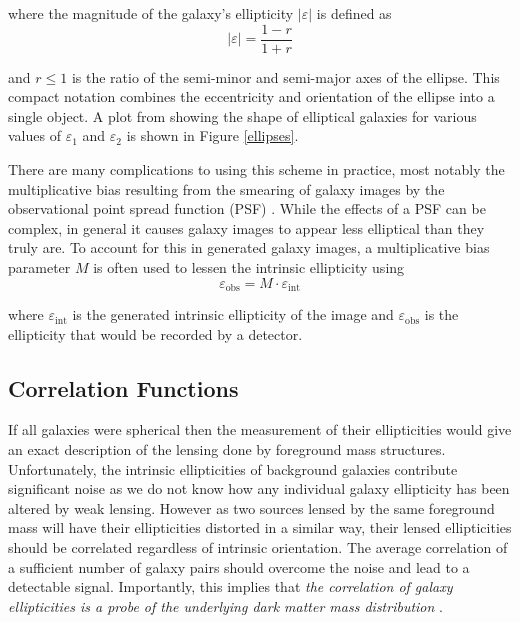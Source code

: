 \documentclass[%
 reprint,
 amsmath,amssymb,
 aps,nofootinbib
]{revtex4-1}
\begin{document}
\noindent where the magnitude of the galaxy's ellipticity $|\varepsilon|$ is defined as
\begin{equation}
|\varepsilon|=\frac{1-r}{1+r}
\end{equation}

\noindent and $r\leq1$ is the ratio of the semi-minor and semi-major axes of the ellipse. This compact notation combines the eccentricity and orientation of the ellipse into a single object. A plot from \cite{schneider} showing the shape of elliptical galaxies for various values of $\varepsilon_1$ and $\varepsilon_2$ is shown in Figure \ref{ellipses}.

There are many complications to using this scheme in practice, most notably the multiplicative bias resulting from the smearing of galaxy images by the observational point spread function (PSF) \cite{multiplicative_bias}. While the effects of a PSF can be complex, in general it causes galaxy images to appear less elliptical than they truly are. To account for this in generated galaxy images, a multiplicative bias parameter $M$ is often used to lessen the intrinsic ellipticity using
\begin{equation}\label{mult_bias}
\varepsilon_{\text{obs}}=M\cdot\varepsilon_{\text{int}}
\end{equation}

\noindent where $\varepsilon_{\text{int}}$ is the generated intrinsic ellipticity of the image and $\varepsilon_{\text{obs}}$ is the ellipticity that would be recorded by a detector.


\subsection{Correlation Functions} \label{corr_functions}

If all galaxies were spherical then the measurement of their ellipticities would give an exact description of the lensing done by foreground mass structures. Unfortunately, the intrinsic ellipticities of background galaxies contribute significant noise as we do not know how any individual galaxy ellipticity has been altered by weak lensing. However as two sources lensed by the same foreground mass will have their ellipticities distorted in a similar way, their lensed ellipticities should be correlated regardless of intrinsic orientation. The average correlation of a sufficient number of galaxy pairs should overcome the noise and lead to a detectable signal. Importantly, this implies that \textit{the correlation of galaxy ellipticities is a probe of the underlying dark matter mass distribution} \cite{dark_matter_probe}.
\end{document}
